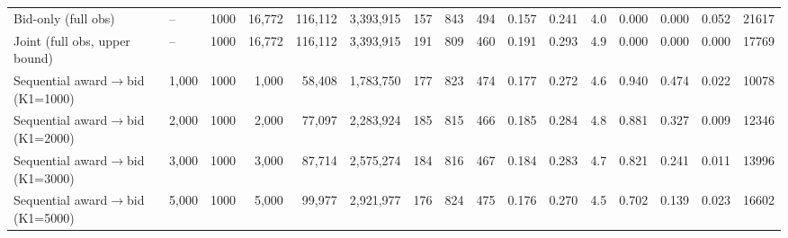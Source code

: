 \begin{tabular}{llrrrrrrrccccccr}
Bid-only (full obs) & -- & 1000 & 16,772 & 116,112 & 3,393,915 & 157 & 843 & 494 & 0.157 & 0.241 & 4.0 & 0.000 & 0.000 & 0.052 & 21617 \\
Joint (full obs, upper bound) & -- & 1000 & 16,772 & 116,112 & 3,393,915 & 191 & 809 & 460 & 0.191 & 0.293 & 4.9 & 0.000 & 0.000 & 0.000 & 17769 \\
Sequential award$\to$bid (K1=1000) & 1,000 & 1000 & 1,000 & 58,408 & 1,783,750 & 177 & 823 & 474 & 0.177 & 0.272 & 4.6 & 0.940 & 0.474 & 0.022 & 10078 \\
Sequential award$\to$bid (K1=2000) & 2,000 & 1000 & 2,000 & 77,097 & 2,283,924 & 185 & 815 & 466 & 0.185 & 0.284 & 4.8 & 0.881 & 0.327 & 0.009 & 12346 \\
Sequential award$\to$bid (K1=3000) & 3,000 & 1000 & 3,000 & 87,714 & 2,575,274 & 184 & 816 & 467 & 0.184 & 0.283 & 4.7 & 0.821 & 0.241 & 0.011 & 13996 \\
Sequential award$\to$bid (K1=5000) & 5,000 & 1000 & 5,000 & 99,977 & 2,921,977 & 176 & 824 & 475 & 0.176 & 0.270 & 4.5 & 0.702 & 0.139 & 0.023 & 16602 \\
\bottomrule
\end{tabular}
